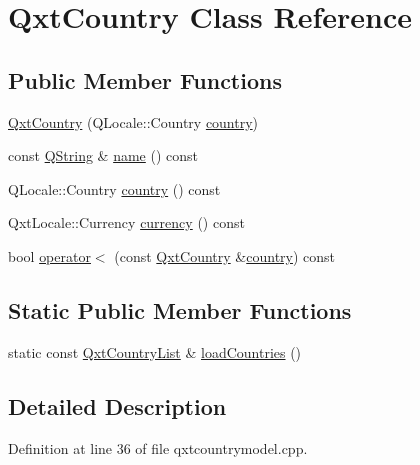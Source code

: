\hypertarget{class_qxt_country}{\section{Qxt\-Country Class Reference}
\label{class_qxt_country}
}
\subsection*{Public Member Functions}
\begin{DoxyCompactItemize}
\item 
\hyperlink{class_qxt_country_a1ed82e42cfc25a81cf4c4cb06844b549}{Qxt\-Country} (Q\-Locale\-::\-Country \hyperlink{class_qxt_country_a9a7f94ba592fbad804d8a2d54e6be366}{country})
\item 
const \hyperlink{group___u_a_v_objects_plugin_gab9d252f49c333c94a72f97ce3105a32d}{Q\-String} \& \hyperlink{class_qxt_country_a4f01fe6c55c516f041512b7d84fae0df}{name} () const 
\item 
Q\-Locale\-::\-Country \hyperlink{class_qxt_country_a9a7f94ba592fbad804d8a2d54e6be366}{country} () const 
\item 
Qxt\-Locale\-::\-Currency \hyperlink{class_qxt_country_abe82514cba89b1f289eecd1e12eba15c}{currency} () const 
\item 
bool \hyperlink{class_qxt_country_a9dbc5e7b6b54dc2f21cdabb1ebff91d2}{operator$<$} (const \hyperlink{class_qxt_country}{Qxt\-Country} \&\hyperlink{class_qxt_country_a9a7f94ba592fbad804d8a2d54e6be366}{country}) const 
\end{DoxyCompactItemize}
\subsection*{Static Public Member Functions}
\begin{DoxyCompactItemize}
\item 
static const \hyperlink{qxtcountrymodel_8cpp_ae083a01aebdaf6d732314a056f497efb}{Qxt\-Country\-List} \& \hyperlink{class_qxt_country_ae3fe50ee9b67a0a3aa605044a938db8c}{load\-Countries} ()
\end{DoxyCompactItemize}


\subsection{Detailed Description}


Definition at line 36 of file qxtcountrymodel.\-cpp.



